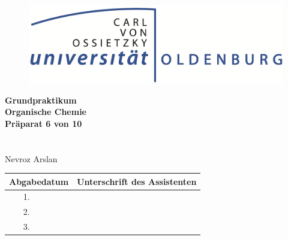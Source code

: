 \documentclass[12pt]{article}
\begin{document}
\center
\begin{figure}[ht!]
\centering
\includegraphics[width=\textwidth]{ol.png}
\label{overflow}
\end{figure}

\textbf{\Large Grundpraktikum}\\[0.60cm] 
\textbf{\Large Organische Chemie}\\[0.60cm] 
\textbf{Präparat 6 von 10}\\[0.60cm] 
\textbf{}\\[1.60cm]
\\[1.60cm]
Nevroz Arslan\\

\begin{center}
\begin{tabular}{ |c|c|c| }
  \hline
  \multicolumn{2}{|C{4cm}|}{Abgabedatum} & Unterschrift des Assistenten  \\
  \hline
  1. &  & \\
  \hline
  2. &  & \\
  \hline
  3. &  &  \\
  \hline
\end{tabular}
\end{center}
\end{document}
